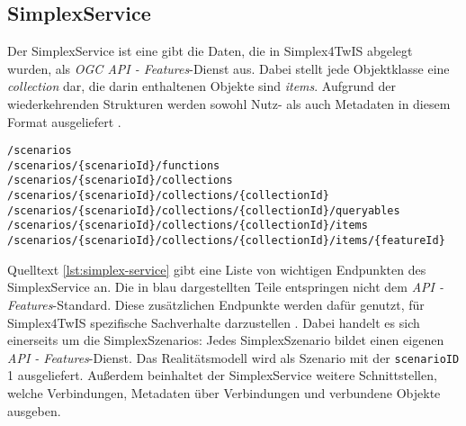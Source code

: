 \subsection{SimplexService}
\label{sec:simplex-service}

Der SimplexService ist eine gibt die Daten, die in Simplex4TwIS abgelegt wurden, als \textit{OGC API - Features}-Dienst aus. Dabei stellt jede Objektklasse eine \textit{collection} dar, die darin enthaltenen Objekte sind \textit{items}. Aufgrund der wiederkehrenden Strukturen werden sowohl Nutz- als auch Metadaten in diesem Format ausgeliefert \parencite{grossmannEnvVisioService2022}.

\begin{lstlisting}[float=!ht,language=simplexservice,caption={Ausgewählte Endpunkte des SimplexService. Schwarz dargestellte Abschnitte sind Teil des \textit{OGC API - Features}-Standard, während die blauen Teile vom SimplexService hinzugefügt wurden. \parencite{simplex4datagmbhSimplexServiceDokumenation}},label=lst:simplex-service]
/scenarios
/scenarios/{scenarioId}/functions
/scenarios/{scenarioId}/collections
/scenarios/{scenarioId}/collections/{collectionId}
/scenarios/{scenarioId}/collections/{collectionId}/queryables
/scenarios/{scenarioId}/collections/{collectionId}/items
/scenarios/{scenarioId}/collections/{collectionId}/items/{featureId}
\end{lstlisting}

Quelltext \ref{lst:simplex-service} gibt eine Liste von wichtigen Endpunkten des SimplexService an. Die in blau dargestellten Teile entspringen nicht dem \textit{API - Features}-Standard. Diese zusätzlichen Endpunkte werden dafür genutzt, für Simplex4TwIS spezifische Sachverhalte darzustellen \parencite{grossmannEnvVisioService2022}. Dabei handelt es sich einerseits um die SimplexSzenarios: Jedes SimplexSzenario bildet einen eigenen \textit{API - Features}-Dienst. Das Realitätsmodell wird als Szenario mit der \texttt{scenarioID} 1 ausgeliefert. Außerdem beinhaltet der SimplexService weitere Schnittstellen, welche Verbindungen, Metadaten über Verbindungen und verbundene Objekte ausgeben.
